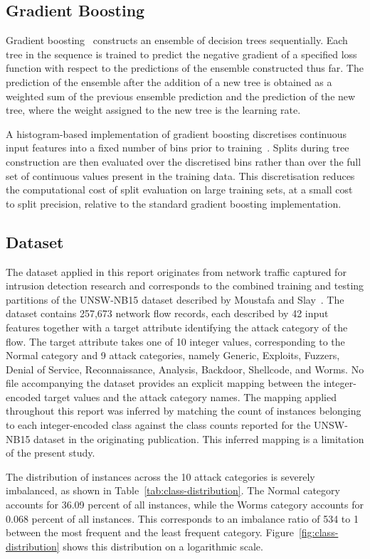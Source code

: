 \documentclass[conference,10pt]{IEEEtran}
\begin{document}
\subsection{Gradient Boosting}
Gradient boosting~\cite{friedman2001gradientboosting} constructs an ensemble of decision trees sequentially. Each tree in the sequence is trained to predict the negative gradient of a specified loss function with respect to the predictions of the ensemble constructed thus far. The prediction of the ensemble after the addition of a new tree is obtained as a weighted sum of the previous ensemble prediction and the prediction of the new tree, where the weight assigned to the new tree is the learning rate.

A histogram-based implementation of gradient boosting discretises continuous input features into a fixed number of bins prior to training~\cite{ke2017lightgbm}. Splits during tree construction are then evaluated over the discretised bins rather than over the full set of continuous values present in the training data. This discretisation reduces the computational cost of split evaluation on large training sets, at a small cost to split precision, relative to the standard gradient boosting implementation.

\subsection{Dataset}
The dataset applied in this report originates from network traffic captured for intrusion detection research and corresponds to the combined training and testing partitions of the UNSW-NB15 dataset described by Moustafa and Slay~\cite{moustafa2015unsw}. The dataset contains 257,673 network flow records, each described by 42 input features together with a target attribute identifying the attack category of the flow. The target attribute takes one of 10 integer values, corresponding to the Normal category and 9 attack categories, namely Generic, Exploits, Fuzzers, Denial of Service, Reconnaissance, Analysis, Backdoor, Shellcode, and Worms. No file accompanying the dataset provides an explicit mapping between the integer-encoded target values and the attack category names. The mapping applied throughout this report was inferred by matching the count of instances belonging to each integer-encoded class against the class counts reported for the UNSW-NB15 dataset in the originating publication. This inferred mapping is a limitation of the present study.

The distribution of instances across the 10 attack categories is severely imbalanced, as shown in Table~\ref{tab:class-distribution}. The Normal category accounts for 36.09 percent of all instances, while the Worms category accounts for 0.068 percent of all instances. This corresponds to an imbalance ratio of 534 to 1 between the most frequent and the least frequent category. Figure~\ref{fig:class-distribution} shows this distribution on a logarithmic scale.
\end{document}
